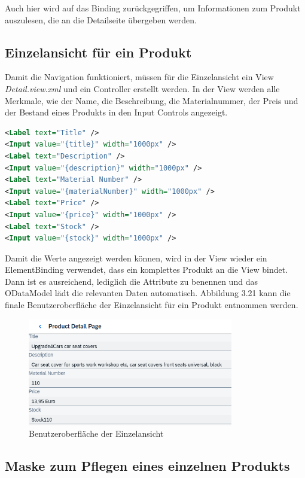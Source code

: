 Auch hier wird auf das Binding zurückgegriffen, um Informationen zum Produkt auszulesen, die an die Detailseite übergeben werden.

\subsection{Einzelansicht für ein Produkt}
Damit die Navigation funktioniert, müssen für die Einzelansicht ein View \textit{Detail.view.xml} und ein Controller erstellt werden. In der View werden alle Merkmale, wie der Name, die Beschreibung, die Materialnummer, der Preis und der Bestand eines Produkts in den Input Controls angezeigt.
\begin{lstlisting}[language=XML, caption=Auszüge aus der View \texttt{Detail.view.xml}]
<Label text="Title" />    		
<Input value="{title}" width="1000px" />
<Label text="Description" /> 		
<Input value="{description}" width="1000px" />
<Label text="Material Number" />	
<Input value="{materialNumber}" width="1000px" />
<Label text="Price" />			
<Input value="{price}" width="1000px" />
<Label text="Stock" />		
<Input value="{stock}" width="1000px" />
\end{lstlisting}
Damit die Werte angezeigt werden können, wird in der View wieder ein ElementBinding verwendet, dass ein komplettes Produkt an die View bindet. Dann ist es ausreichend, lediglich die Attribute zu benennen und das ODataModel lädt die relevanten Daten automatisch. Abbildung 3.21 kann die finale Benutzeroberfläche der Einzelansicht für ein Produkt entnommen werden.
\begin{figure}[htbp]
 \centering
 \includegraphics[width=0.8\textwidth]{Bilder/ui5 freestyle/3_21_Einzelansicht.png}
 \caption{Benutzeroberfläche der Einzelansicht}
\end{figure}

\subsection{Maske zum Pflegen eines einzelnen Produkts}

